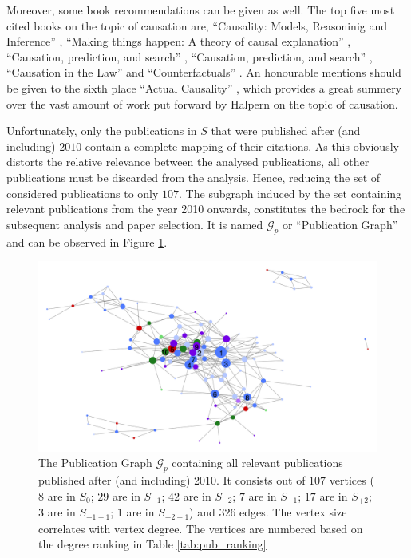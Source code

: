 \documentclass[11pt,a4paper]{book}
\theoremstyle{definition}
\theoremstyle{definition}
\theoremstyle{definition}
\theoremstyle{remark}
\newcommand{\pset}{S}
\newcommand{\psetz}{S_{\mathit{0}}}
\newcommand{\psetb}{S_{\mathit{-1}}}
\newcommand{\psetbb}{S_{\mathit{-2}}}
\newcommand{\psetf}{S_{\mathit{+1}}}
\newcommand{\psetff}{S_{\mathit{+2}}}
\newcommand{\psetfb}{S_{\mathit{+1-1}}}
\newcommand{\psetffb}{S_{\mathit{+2-1}}}
\newcommand{\pgraph}{\mathcal{G}_{p}}
\begin{document}
Moreover, some book recommendations can be given as well. The top five most cited books on the topic of causation are, ``Causality: Models, Reasoninig and Inference'' \parencite{pearl2009causality}, ``Making things happen: A theory of causal explanation'' \parencite{woodward2005making},
``Causation, prediction, and search'' \parencite{spirtes2000causation}, ``Causation, prediction, and search'' \parencite{spirtes2000causation}, ``Causation in the Law'' \parencite{hart1985causation}  and ``Counterfactuals'' \parencite{lewis2013counterfactuals}. An honourable mentions should be given to the sixth place ``Actual Causality'' \parencite{halpern2016actual}, which provides a great summery over the vast amount of work put forward by Halpern
on the topic of causation.



Unfortunately, only the publications in $\pset$ that were published after (and including) $2010$ contain a complete mapping of their citations. As this obviously distorts the relative relevance between the analysed publications, all other publications must be discarded from the analysis. Hence, reducing the set of considered publications to only $107$. The subgraph induced by the set containing relevant publications from the year 2010 onwards, constitutes the bedrock for the subsequent analysis and paper selection. It is named $\pgraph$ or ``Publication Graph'' and can be observed in Figure \ref{fig:pgraph-actual_graph}. 

\begin{figure}[h!]
\includegraphics[width=\textwidth]{actual_graph.png}
\caption{The Publication Graph  $\pgraph$ containing all relevant publications published after (and including) 2010. It consists out of $107$ vertices ($8$ are in \textcolor{cstepz}{$\psetz$}; $29$ are in \textcolor{cstepb}{$\psetb$};
$42$ are in \textcolor{cstepbb}{$\psetbb$}; $7$ are in \textcolor{cstepf}{$\psetf$}; $17$ are in \textcolor{cstepff}{$\psetff$}; $3$ are in \textcolor{cstepfb}{$\psetfb$}; $1$ are in \textcolor{cstepffb}{$\psetffb$}) and $326$ edges.
The vertex size correlates with vertex degree. The vertices are numbered based on the degree ranking in Table \ref{tab:pub_ranking}}
\label{fig:pgraph-actual_graph}
\end{figure}
\end{document}
